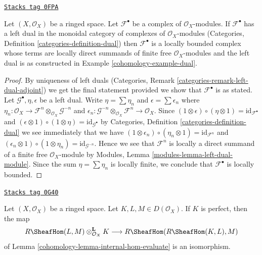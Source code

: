 \begin{lemma}
\label{cohomology-lemma-left-dual-complex}
\href{https://stacks.math.columbia.edu/tag/0FPA}{\texttt{Stacks tag 0FPA}}

Let $(X, \mathcal{O}_X)$ be a ringed space. Let $\mathcal{F}^\bullet$
be a complex of $\mathcal{O}_X$-modules. If $\mathcal{F}^\bullet$
has a left dual in the monoidal category of complexes of
$\mathcal{O}_X$-modules
(Categories, Definition \ref{categories-definition-dual})
then $\mathcal{F}^\bullet$ is a locally bounded complex whose terms are
locally direct summands of finite free $\mathcal{O}_X$-modules
and the left dual is as constructed in Example \ref{cohomology-example-dual}.
\end{lemma}

\begin{proof}
By uniqueness of left duals
(Categories, Remark \ref{categories-remark-left-dual-adjoint})
we get the final statement provided we show that $\mathcal{F}^\bullet$
is as stated. Let $\mathcal{G}^\bullet, \eta, \epsilon$ be a left dual.
Write $\eta = \sum \eta_n$ and $\epsilon = \sum \epsilon_n$
where $\eta_n : \mathcal{O}_X \to
\mathcal{F}^n \otimes_{\mathcal{O}_X} \mathcal{G}^{-n}$
and
$\epsilon_n : \mathcal{G}^{-n} \otimes_{\mathcal{O}_X} \mathcal{F}^n
\to \mathcal{O}_X$. Since
$(1 \otimes \epsilon) \circ (\eta \otimes 1) = \text{id}_{\mathcal{F}^\bullet}$
and
$(\epsilon \otimes 1) \circ (1 \otimes \eta) = \text{id}_{\mathcal{G}^\bullet}$
by Categories, Definition \ref{categories-definition-dual} we see immediately
that we have
$(1 \otimes \epsilon_n) \circ (\eta_n \otimes 1) = \text{id}_{\mathcal{F}^n}$
and
$(\epsilon_n \otimes 1) \circ (1 \otimes \eta_n) =
\text{id}_{\mathcal{G}^{-n}}$.
Hence we see that $\mathcal{F}^n$ is locally a direct summand of a finite
free $\mathcal{O}_X$-module by
Modules, Lemma \ref{modules-lemma-left-dual-module}.
Since the sum $\eta = \sum \eta_n$ is locally finite, we conclude that
$\mathcal{F}^\bullet$ is locally bounded.
\end{proof}

\begin{lemma}
\label{cohomology-lemma-internal-hom-evaluate-isom}
\href{https://stacks.math.columbia.edu/tag/0G40}{\texttt{Stacks tag 0G40}}

Let $(X, \mathcal{O}_X)$ be a ringed space. Let $K, L, M \in D(\mathcal{O}_X)$.
If $K$ is perfect, then the map
$$
R\SheafHom(L, M) \otimes_{\mathcal{O}_X}^\mathbf{L} K
\longrightarrow
R\SheafHom(R\SheafHom(K, L), M)
$$
of Lemma \ref{cohomology-lemma-internal-hom-evaluate} is an isomorphism.
\end{lemma}

